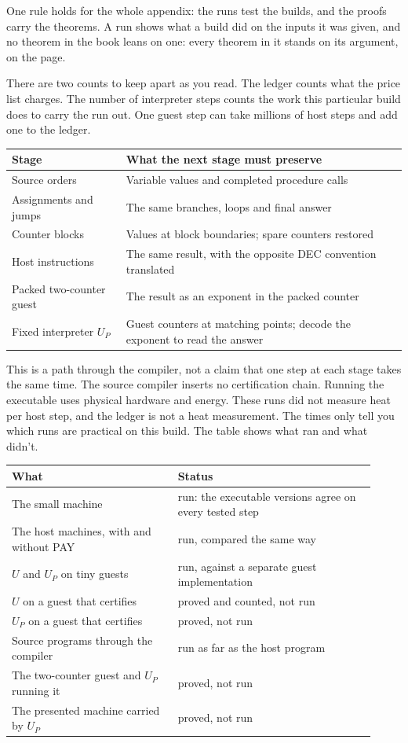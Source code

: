 \documentclass[11pt,twoside]{article}
\theoremstyle{thielethm}
\theoremstyle{thieledef}
\theoremstyle{thieledef}
\theoremstyle{thieledef}
\theoremstyle{thielethm}
\theoremstyle{thieleobs}
\theoremstyle{thielethm}
\begin{document}
One rule holds for the whole appendix: the runs test the builds, and the proofs carry the theorems. A
run shows what a build did on the inputs it was given, and no theorem in the book leans on one: every theorem in it stands on its argument, on the page.

There are two counts to keep apart as you read. The ledger counts what the price list charges. The
number of interpreter steps counts the work this particular build does to carry the run out.
One guest step can take millions of host steps and add one to the ledger.

\begin{center}
\small
\begin{tabular}{@{}p{.27\linewidth}p{.63\linewidth}@{}}
Stage & What the next stage must preserve \\ \hline
Source orders & Variable values and completed procedure calls \\
Assignments and jumps & The same branches, loops and final answer \\
Counter blocks & Values at block boundaries; spare counters restored \\
Host instructions & The same result, with the opposite DEC convention translated \\
Packed two-counter guest & The result as an exponent in the packed counter \\
Fixed interpreter $U_P$ & Guest counters at matching points; decode the exponent to read the answer \\ \hline
\end{tabular}
\end{center}
This is a path through the compiler, not a claim that one step at each stage
takes the same time. The source compiler inserts no certification chain. Running the executable uses physical hardware and energy. These runs did not measure
heat per host step, and the ledger is not a heat measurement. The times only
tell you which runs are practical on this build. The table shows what ran and what didn't.

\begin{center}
\begin{tabular}{@{}p{0.42\linewidth}p{0.5\linewidth}@{}}
\textbf{What} & \textbf{Status} \\ \hline
The small machine & run: the executable versions agree on every tested step \\
The host machines, with and without PAY & run, compared the same way \\
$U$ and $U_P$ on tiny guests & run, against a separate guest implementation \\
$U$ on a guest that certifies & proved and counted, not run \\ $U_P$ on a guest that certifies & proved, not run \\
Source programs through the compiler & run as far as the host program \\
The two-counter guest and $U_P$ running it & proved, not run \\
The presented machine carried by $U_P$ & proved, not run \\
\end{tabular}
\end{center}
\end{document}

